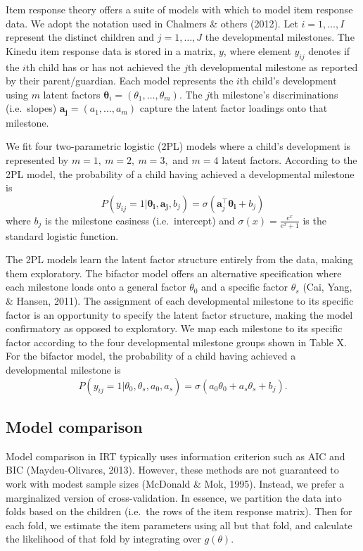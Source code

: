 \documentclass[10pt, letterpaper]{article}
\begin{document}
Item response theory offers a suite of models with which to model item
response data. We adopt the notation used in Chalmers \& others (2012).
Let \(i = 1, \ldots, I\) represent the distinct children and
\(j = 1, \ldots, J\) the developmental milestones. The Kinedu item
response data is stored in a matrix, \(y\), where element \(y_{ij}\)
denotes if the \(i\)th child has or has not achieved the \(j\)th
developmental milestone as reported by their parent/guardian. Each model
represents the \(i\)th child's development using \(m\) latent factors
\(\boldsymbol{\theta}_{i}=(\theta_1, \ldots, \theta_m)\). The \(j\)th
milestone's discriminations (i.e.~slopes)
\(\boldsymbol{a_j}=(a_1, \dots, a_m)\) capture the latent factor
loadings onto that milestone.

We fit four two-parametric logistic (2PL) models where a child's
development is represented by \(m = 1, \ m = 2, \ m = 3,\) and \(m = 4\)
latent factors. According to the 2PL model, the probability of a child
having achieved a developmental milestone is \[
P(y_{ij} = 1 | \boldsymbol{\theta_i}, \boldsymbol{a_j}, b_j) = \sigma(\boldsymbol{a}_{j}^{\top}\boldsymbol{\theta_i} + b_j)
\] where \(b_j\) is the milestone easiness (i.e.~intercept) and
\(\sigma(x) = \frac{e^x}{e^x + 1}\) is the standard logistic function.

The 2PL models learn the latent factor structure entirely from the data,
making them exploratory. The bifactor model offers an alternative
specification where each milestone loads onto a general factor
\(\theta_0\) and a specific factor \(\theta_s\) (Cai, Yang, \& Hansen,
2011). The assignment of each developmental milestone to its specific
factor is an opportunity to specify the latent factor structure, making
the model confirmatory as opposed to exploratory. We map each milestone
to its specific factor according to the four developmental milestone
groups shown in Table X. For the bifactor model, the probability of a
child having achieved a developmental milestone is \[
P(y_{ij} = 1 | \theta_0, \theta_s, a_0, a_s) = \sigma(a_0\theta_0 + a_s\theta_s + b_j).
\]

\hypertarget{model-comparison}{%
\subsection{Model comparison}\label{model-comparison}}

Model comparison in IRT typically uses information criterion such as AIC
and BIC (Maydeu-Olivares, 2013). However, these methods are not
guaranteed to work with modest sample sizes (McDonald \& Mok, 1995).
Instead, we prefer a marginalized version of cross-validation. In
essence, we partition the data into folds based on the children
(i.e.~the rows of the item response matrix). Then for each fold, we
estimate the item parameters using all but that fold, and calculate the
likelihood of that fold by integrating over \(g(\theta)\).
\end{document}
